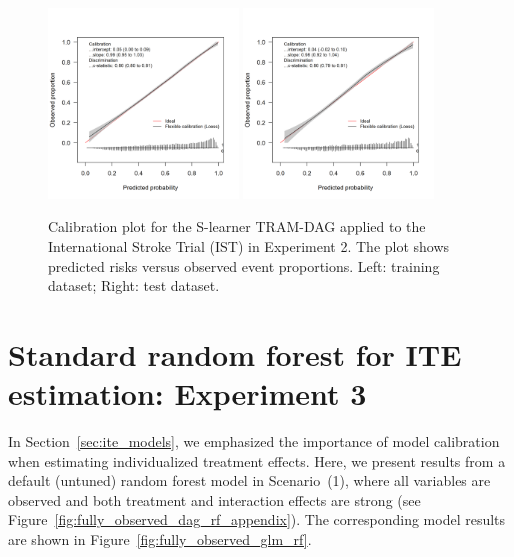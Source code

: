 \begin{figure}[htbp]
\centering
\includegraphics[width=0.45\textwidth]{img/results_IST/IST_TRAM_DAG_slearner_train_calibration_plot.png}
\includegraphics[width=0.45\textwidth]{img/results_IST/IST_TRAM_DAG_slearner_test_calibration_plot.png}
\caption{Calibration plot for the S-learner TRAM-DAG applied to the International Stroke Trial (IST) in Experiment 2. The plot shows predicted risks versus observed event proportions. Left: training dataset; Right: test dataset.}
\label{fig:calibration_IST_TRAM_DAG}
\end{figure}


\clearpage


\section{Standard random forest for ITE estimation: Experiment 3} \label{sec:default_rf_ite}

In Section~\ref{sec:ite_models}, we emphasized the importance of model calibration when estimating individualized treatment effects. Here, we present results from a default (untuned) random forest model in Scenario~(1), where all variables are observed and both treatment and interaction effects are strong (see Figure~\ref{fig:fully_observed_dag_rf_appendix}). The corresponding model results are shown in Figure~\ref{fig:fully_observed_glm_rf}.

